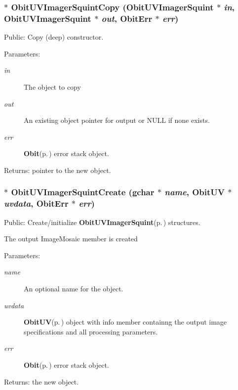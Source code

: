 \subsubsection{$\ast$ Obit\-UVImager\-Squint\-Copy ({\bf Obit\-UVImager\-Squint} $\ast$ {\em in}, {\bf Obit\-UVImager\-Squint} $\ast$ {\em out}, {\bf Obit\-Err} $\ast$ {\em err})}\label{ObitUVImagerSquint_8c_a9}


Public: Copy (deep) constructor. 

\begin{Desc}
\item[Parameters:]
\begin{description}
\item[{\em in}]The object to copy \item[{\em out}]An existing object pointer for output or NULL if none exists. \item[{\em err}]{\bf Obit}{\rm (p.\,\pageref{structObit})} error stack object. \end{description}
\end{Desc}
\begin{Desc}
\item[Returns:]pointer to the new object. \end{Desc}
\subsubsection{$\ast$ Obit\-UVImager\-Squint\-Create (gchar $\ast$ {\em name}, {\bf Obit\-UV} $\ast$ {\em uvdata}, {\bf Obit\-Err} $\ast$ {\em err})}\label{ObitUVImagerSquint_8c_a11}


Public: Create/initialize {\bf Obit\-UVImager\-Squint}{\rm (p.\,\pageref{structObitUVImagerSquint})} structures. 

The output Image\-Mosaic member is created \begin{Desc}
\item[Parameters:]
\begin{description}
\item[{\em name}]An optional name for the object. \item[{\em uvdata}]{\bf Obit\-UV}{\rm (p.\,\pageref{structObitUV})} object with info member containng the output image specifications and all processing parameters. \item[{\em err}]{\bf Obit}{\rm (p.\,\pageref{structObit})} error stack object. \end{description}
\end{Desc}
\begin{Desc}
\item[Returns:]the new object. \end{Desc}
